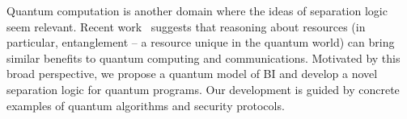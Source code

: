 \documentclass[conference,compsoc, 10pt]{IEEEtran}
\newcommand{\gb}[1]{\textit{\color{green}[GB] : #1}}
\def\>{\ensuremath{\rangle}}
\begin{document}
        Quantum computation is another domain where the ideas of separation
        logic seem relevant. Recent work~\cite{CoeckeFS16,Doc19} suggests that
        reasoning about resources (in particular, entanglement -- a resource
        unique in the quantum world) can bring similar benefits to quantum
        computing and communications. Motivated by this broad perspective, we
        propose a quantum model of BI and develop a novel separation logic for
        quantum programs. Our development is guided by concrete examples of
        quantum algorithms and security protocols.
	
	
	

	
	
	{\vskip 3pt}
	
\end{document}
